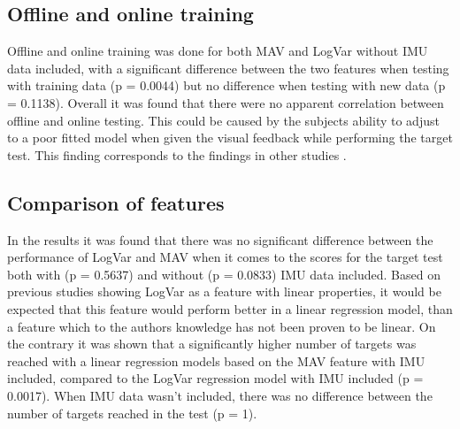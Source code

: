 	
	\subsection{Offline and online training}
	Offline and online training was done for both MAV and LogVar without IMU data included, with a significant difference between the two features when testing with training data (p = 0.0044) but no difference when testing with new data (p = 0.1138). Overall it was found that there were no apparent correlation between offline and online testing. This could be caused by the subjects ability to adjust to a poor fitted model when given the visual feedback while performing the target test. This finding corresponds to the findings in other studies \cite{jiang2010}.
	
	\subsection{Comparison of features}
	In the results it was found that there was no significant difference between the performance of LogVar and MAV when it comes to the scores for the target test both with (p = 0.5637) and without (p = 0.0833) IMU data included. Based on previous studies showing LogVar as a feature with linear properties, it would be expected that this feature would perform better in a linear regression model, than a feature which to the authors knowledge has not been proven to be linear. On the contrary it was shown that a significantly higher number of targets was reached with a linear regression models based on the MAV feature with IMU included, compared to the LogVar regression model with IMU included (p = 0.0017). When IMU data wasn't included, there was no difference between the number of targets reached in the test (p = 1).
	
